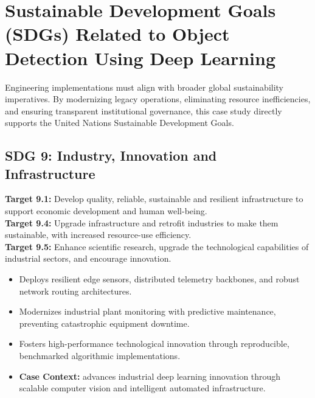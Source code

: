 \section{Sustainable Development Goals (SDGs) Related to Object Detection Using Deep Learning}
Engineering implementations must align with broader global sustainability imperatives. By modernizing legacy operations, eliminating resource inefficiencies, and ensuring transparent institutional governance, this case study directly supports the United Nations Sustainable Development Goals.

\subsection{SDG 9: Industry, Innovation and Infrastructure}
\noindent\textbf{Target 9.1:} Develop quality, reliable, sustainable and resilient infrastructure to support economic development and human well-being. \\
\noindent\textbf{Target 9.4:} Upgrade infrastructure and retrofit industries to make them sustainable, with increased resource-use efficiency. \\
\noindent\textbf{Target 9.5:} Enhance scientific research, upgrade the technological capabilities of industrial sectors, and encourage innovation.
\begin{itemize}
  \item Deploys resilient edge sensors, distributed telemetry backbones, and robust network routing architectures.
  \item Modernizes industrial plant monitoring with predictive maintenance, preventing catastrophic equipment downtime.
  \item Fosters high-performance technological innovation through reproducible, benchmarked algorithmic implementations.
  \item \textbf{Case Context:} advances industrial deep learning innovation through scalable computer vision and intelligent automated infrastructure.
\end{itemize}

